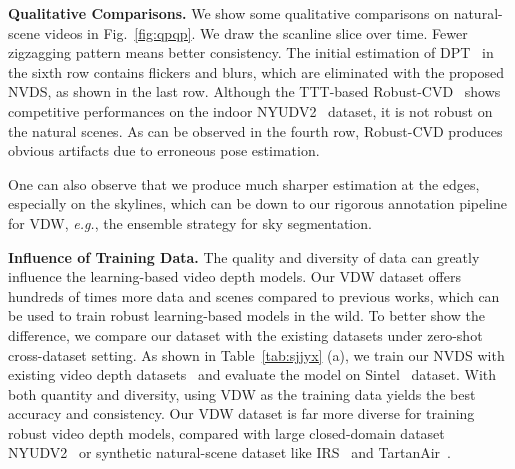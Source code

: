 \documentclass[10pt,twocolumn,letterpaper]{article}
\def\sx{NVDS}
\def\data{VDW}
\def\reffig{Fig.}
\def\reftab{Table}
\begin{document}
\begin{table}
\begin{center}
\end{center}
\vspace{-12pt}
\caption{
\textbf{Comparisons of different depth predictors on the NYUDV2~\cite{nyu} dataset.} Our framework is compatible with different depth predictors in a plug-and-play manner.}
\label{tab:blab}
\end{table}



\noindent \textbf{Qualitative Comparisons.}
We show some qualitative comparisons on natural-scene videos in \reffig{}~\ref{fig:qpqp}. We draw the scanline slice over time. Fewer zigzagging pattern means better consistency. The initial estimation of DPT~\cite{dpt} in the sixth row contains flickers and blurs, which are eliminated with the proposed \sx{}, as shown in the last row. Although the TTT-based Robust-CVD~\cite{rcvd} shows competitive performances on the indoor NYUDV2~\cite{nyu} dataset, it is not robust on the natural scenes. As can be observed in the fourth row, Robust-CVD produces obvious artifacts due to erroneous pose estimation. 

One can also observe that we produce much sharper estimation at the edges, especially on the skylines, which can be down to our rigorous annotation pipeline for \data{}, \textit{e.g.}, the ensemble strategy for sky segmentation.

\noindent \textbf{Influence of Training Data.}
The quality and diversity of data can greatly influence the learning-based video depth models. Our \data{} dataset offers hundreds of times more data and scenes compared to previous works, which can be used to train robust learning-based models in the wild. To better show the difference, we compare our dataset with the existing datasets under zero-shot cross-dataset setting. As shown in \reftab{}~\ref{tab:sjjyx} (a), we train our \sx{} with existing video depth datasets~\cite{nyu,irs,tata} and evaluate the model on Sintel~\cite{sintel} dataset. With both quantity and diversity, using \data{} as the training data yields the best accuracy and consistency. Our VDW
dataset is far more diverse for training robust video depth models, compared with large closed-domain dataset NYUDV2~\cite{nyu} or synthetic natural-scene dataset like IRS~\cite{irs} and TartanAir~\cite{tata}. 
\end{document}
